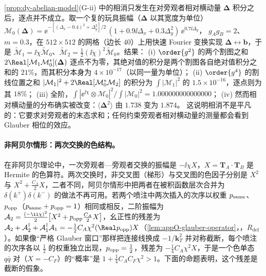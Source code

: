 \begin{example}\label{ex:dy-glauber-model}
\cref{prop:dy-abelian-model}(G-ii) 中的相消只发生在对旁观者相对横动量 $\boldsymbol\Delta$ 积分之后，逐点并不成立。取一个复的玩具振幅（$\boldsymbol\Delta$ 以其宽度为单位）
$\mathcal M_0(\boldsymbol\Delta)=\ee^{-[(\Delta_x-0.4)^2+\Delta_y^2]/2}\,(1+0.9\ii\Delta_x+0.3\Delta_y^2)\,\ee^{0.7\ii\Delta_y}$，
$g_Ag_B=2$、$m=0.3$，在 $512\times512$ 的网格（边长 $40$）上用快速 Fourier 变换实现 $\boldsymbol\Delta\leftrightarrow\boldsymbol b$，于是 $\tilde{\mathcal M}_1=\ii\chi\tilde{\mathcal M}_0$、$\tilde{\mathcal M}_2=\frac12(\ii\chi)^2\tilde{\mathcal M}_0$。结果：
(i) $\order{g^2}$ 的两个割图之和 $2\Real[\mathcal M_1\mathcal M_0^*](\boldsymbol\Delta)$ 逐点不为零，其绝对值的积分是两个割图各自绝对值积分之和的 $21\%$，而其积分本身为 $4\times10^{-17}$（以同一量为单位）；
(ii) $\order{g^4}$ 的割线位置之和 $|\mathcal M_1|^2+2\Real[\mathcal M_0^*\mathcal M_2]$ 的积分为 $\int|\mathcal M_1|^2$ 的 $1.5\times10^{-16}$，逐点则为其 $18\%$；
(iii) 全阶，$\int|\ee^{\ii\chi}\otimes\mathcal M_0|^2/\int|\mathcal M_0|^2=1.000000000000000$；
(iv) 然而相对横动量的分布确实被改变：$\langle\boldsymbol\Delta^2\rangle$ 由 $1.738$ 变为 $1.874$。
这说明相消不是平凡的：它要求对旁观者的末态求和；任何约束旁观者相对横动量的测量都会看到 Glauber 相位的效应。
\end{example}

\paragraph{非阿贝尔情形：两次交换的色结构。}在非阿贝尔理论中，一次旁观者—旁观者交换的振幅是 $-\ii\chi X$，$X=\mathbf T_A\cdot\mathbf T_B$ 是 Hermite 的色算符。两次交换时，非交叉图（梯形）与交叉图的色因子分别是 $X^2$ 与 $X^2+\frac{C_A}2X$，二者不同，阿贝尔情形中把两者在被积函数层次合并为 $\delta(k^+)\delta(k^-)$ 的做法不再可用\cite[第~5.2.1~节]{RothsteinStewart2016}。若两个喷注中两次插入的次序以权重 $p_{\rm same}$、$p_{\rm opp}$（$p_{\rm same}+p_{\rm opp}=1$）相同或相反，二阶振幅为 $\mathcal A_2=\frac{(-\ii\chi)^2}2\big[X^2+p_{\rm opp}\frac{C_A}2X\big]$，幺正性的残差为 $\mathcal A_2+\mathcal A_2^\dagger+\mathcal A_1^\dagger\mathcal A_1=-\frac12C_A\chi^2(\Real p_{\rm opp})X$（\cref{lem:appO-glauber-operator}，\tagR，$R_{\mathrm{def}}$）。如果像“严格 Glauber 窗口”那样把连接线换成 $-1/\mathbf k_T^2$ 并对称截断，每个喷注的次序各以 $\frac12$ 的权重独立出现，$p_{\rm opp}=\frac12$，残差为 $-\frac14C_A\chi^2X$，于是一个色单态 $q\bar q$ 对（$X=-C_F$）的“概率”是 $1+\frac14C_AC_F\chi^2>1$。下面的命题表明，这个残差是截断的假象。

